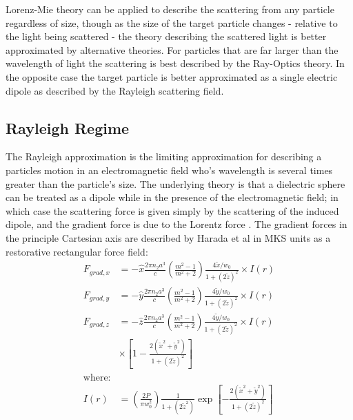 Lorenz-Mie theory can be applied to describe the scattering from any 
particle regardless of size, though as the size of the target particle 
changes - relative to the light being scattered - the theory describing
the scattered light is better approximated by alternative theories. For 
particles that are far larger than the wavelength of light the scattering
is best described by the Ray-Optics theory. In the opposite case the 
target particle is better approximated as a single electric dipole as 
described by the Rayleigh scattering field.  

\subsection{Rayleigh Regime}

The Rayleigh approximation is the limiting approximation for describing 
a particles motion in an electromagnetic field who's wavelength is several 
times greater than the particle's size. The underlying theory is that a 
dielectric sphere can be treated as a dipole while in the presence of the 
electromagnetic field; in which case the scattering force is given simply 
by the scattering of the induced dipole, and the gradient force is due 
to the Lorentz force \cite{Gordon1973}. The gradient forces in the 
principle Cartesian axis are described by Harada et al \cite{YasuhiroHarada1996} 
in MKS units as a restorative rectangular force field:
\begin{align}
  F_{grad,x}
  &=-\hat{x} \frac{2\pi n_2 a^3}{c}
    \left(\frac{m^2-1}{m^2+2}\right) \frac{4\tilde{x}/w_0}{1+(2\tilde{z})^2} \times I(r)
  \\
  F_{grad,y}
  &=-\hat{y} \frac{2\pi n_2 a^3}{c}
    \left(\frac{m^2-1}{m^2+2}\right) \frac{4\tilde{y}/w_0}{1+(2\tilde{z})^2} \times I(r)
  \\
  F_{grad,z}
  &=-\hat{z} \frac{2\pi n_2 a^3}{c}
    \left(\frac{m^2-1}{m^2+2}\right) \frac{4\tilde{y}/w_0}{1+(2\tilde{z})^2}
    \nonumber \times I(r)
  \\ 
  & \times \left[1-\frac{2(\tilde{x}^2+\tilde{y}^2)}{1+(2\tilde{z})^2} \right]
  \\
  \text{where:}
  \nonumber
  \\
	I(r) &= \left(\frac{2P}{\pi w_0^2}\right) \frac{1}{1+(2\tilde{z}^2)} 
	\exp \left[ - \frac{2(\tilde{x}^2+\tilde{y}^2)}{1+(2\tilde{z})^2} \right]
\end{align}

